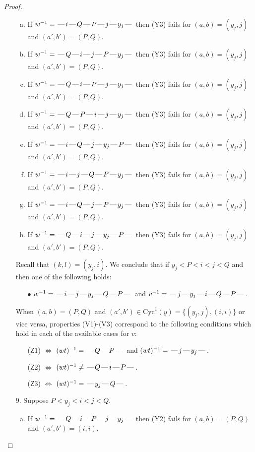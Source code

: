 \documentclass[10pt]{article}
\theoremstyle{definition}
\theoremstyle{definition}
\def\dash{\text{\hspace{0.5mm}---\hspace{0.5mm}}}
\def\Cyc{\mathrm{Cyc}}
\begin{document}
\begin{proof}
\begin{enumerate}
\begin{enumerate}[(a)]
\item If $w^{-1} = \dash i\dash Q\dash P\dash j\dash y_j\dash $ then (Y3) fails for $(a,b)=(y_j,j)$ and $(a',b')=(P,Q)$.
\item If $w^{-1} = \dash Q\dash i\dash j\dash P\dash y_j\dash $ then (Y3) fails for $(a,b)=(y_j,j)$ and $(a',b')=(P,Q)$.
\item If $w^{-1} = \dash Q\dash i\dash P\dash j\dash y_j\dash $ then (Y3) fails for $(a,b)=(y_j,j)$ and $(a',b')=(P,Q)$.
\item If $w^{-1} = \dash Q\dash P\dash i\dash j\dash y_j\dash $ then (Y3) fails for $(a,b)=(y_j,j)$ and $(a',b')=(P,Q)$.
\item If $w^{-1} = \dash i\dash Q\dash j\dash y_j\dash P\dash $ then (Y3) fails for $(a,b)=(y_j,j)$ and $(a',b')=(P,Q)$.
\item If $w^{-1} = \dash i\dash j\dash Q\dash P\dash y_j\dash $ then (Y3) fails for $(a,b)=(y_j,j)$ and $(a',b')=(P,Q)$.
\item If $w^{-1} = \dash i\dash Q\dash j\dash P\dash y_j\dash $ then (Y3) fails for $(a,b)=(y_j,j)$ and $(a',b')=(P,Q)$.
\item If $w^{-1} = \dash Q\dash i\dash j\dash y_j\dash P\dash $ then (Y3) fails for $(a,b)=(y_j,j)$ and $(a',b')=(P,Q)$.
\end{enumerate}
Recall that $(k,l) = (y_j,i)$.
We conclude that if $y_j < P < i < j < Q$ and then one of the following holds:
\begin{enumerate}
\item[$\bullet$] $w^{-1} = \dash i\dash j\dash y_j\dash Q\dash P\dash $ and $v^{-1} = \dash j\dash y_j\dash i\dash Q\dash P\dash $.
\end{enumerate}
When $(a,b)= (P,Q)$ and $(a',b')\in \Cyc^1(y)=\{(y_j,j),(i,i)\}$ or vice versa,
properties (V1)-(V3) correspond to the following conditions which hold in
each of the available cases for $v$:
\begin{enumerate}
\item[](Z1) $\Leftrightarrow$ $(wt)^{-1} = \dash Q \dash P \dash$  and $(wt)^{-1} = \dash j \dash y_j \dash$.
\item[](Z2) $\Leftrightarrow$ $(wt)^{-1} \neq \dash Q \dash i \dash P \dash$.
\item[](Z3) $\Leftrightarrow$ $(wt)^{-1} = \dash y_j \dash Q \dash$.
\end{enumerate}
\item[$9$.] Suppose $P < y_j < i < j < Q$.
\begin{enumerate}[(a)]
\item If $w^{-1} = \dash Q\dash i\dash P\dash j\dash y_j\dash $ then (Y2) fails for $(a,b)=(P,Q)$ and $(a',b')=(i,i)$.

\end{enumerate}
\end{enumerate}
\end{proof}
\end{document}
